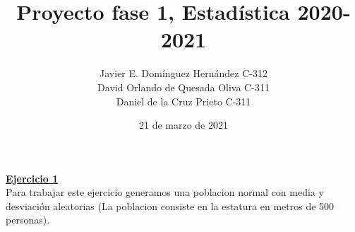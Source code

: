 \documentclass[a4paper,12pt]{article}
\begin{document}
\title{\huge\bf Proyecto fase 1, Estad\'istica 2020-2021}
\author{Javier E. Dom\'inguez Hern\'andez C-312\\
        David Orlando de Quesada Oliva C-311\\
        Daniel de la Cruz Prieto C-311\\        
        }
\date{21 de marzo de 2021}
\maketitle


\textbf{\large\underline{Ejercicio 1}}\\

\noindent Para trabajar este ejercicio generamos una poblacion normal con media y desviaci\'on aleatorias
(La poblacion consiste en la estatura en metros de 500 personas).\\
\end{document}
